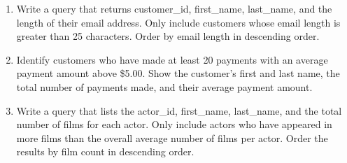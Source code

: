 \documentclass[12pt,a4paper]{article}
\newif\ifshowsolutions
\begin{document}
\begin{enumerate}
\item Write a query that returns customer\_id, first\_name,
last\_name, and the length of their email address.
Only include customers whose email length is greater than 25 characters.
Order by email length in descending order.

\ifshowsolutions
\begin{lstlisting}[language=SQL]
SELECT customer_id,
       first_name,
       last_name,
       LENGTH(email) AS email_length
FROM customer
WHERE LENGTH(email) > 25
ORDER BY email_length DESC;
\end{lstlisting}
\fi
\item Identify customers who have made at least 20 payments with an average payment amount above \$5.00. Show the customer's first and last name, the total number of payments made, and their average payment amount.
\ifshowsolutions
\begin{lstlisting}[language=SQL]
SELECT 
    c.first_name, 
    c.last_name, 
    COUNT(p.payment_id) AS total_payments, 
    ROUND(AVG(p.amount), 2) AS average_payment
FROM customer c
JOIN payment p ON c.customer_id = p.customer_id
GROUP BY c.customer_id, c.first_name, c.last_name
HAVING COUNT(p.payment_id) >= 20 
   AND AVG(p.amount) > 5.00
ORDER BY average_payment DESC;
\end{lstlisting}
\fi

\item Write a query that lists the actor\_id, first\_name, last\_name, and the total number of films for each actor. Only include actors who have appeared in more films than the overall average number of films per actor. Order the results by film count in descending order.

\ifshowsolutions
\begin{lstlisting}[language=SQL]
SELECT a.actor_id,
       a.first_name,
       a.last_name,
       COUNT(fa.film_id) AS film_count
FROM actor a
JOIN film_actor fa ON a.actor_id = fa.actor_id
GROUP BY a.actor_id, a.first_name, a.last_name
HAVING COUNT(fa.film_id) > (
    SELECT AVG(actor_counts.f_count)
    FROM (
        SELECT COUNT(film_id) AS f_count
        FROM film_actor
        GROUP BY actor_id
    ) AS actor_counts
)
ORDER BY film_count DESC;
\end{lstlisting}
\fi


\end{enumerate}
\end{document}
